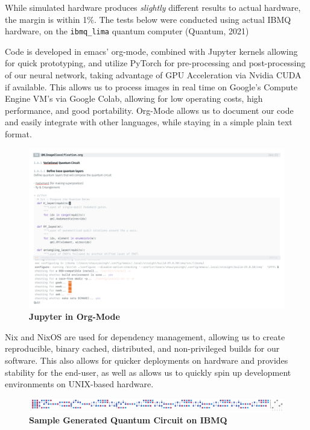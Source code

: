 \documentclass{scrartcl}
\makeatletter
\newcommand{\citeprocitem}[2]{\hyper@linkstart{cite}{citeproc_bib_item_#1}#2\hyper@linkend}
\makeatother
\begin{document}
While simulated hardware produces \emph{slightly} different results to actual hardware, the margin is within 1\%. The tests below were conducted using actual IBMQ hardware, on the \verb~ibmq_lima~ quantum computer (\citeprocitem{14}{Quantum, 2021})

Code is developed in emacs' org-mode, combined with Jupyter kernels allowing for quick prototyping, and utilize PyTorch for pre-processing and post-processing of our neural network, taking advantage of GPU Acceleration via Nvidia CUDA if available. This allows us to process images in real time on Google's Compute Engine VM's via Google Colab, allowing for low operating costs, high performance, and good portability. Org-Mode allows us to document our code and easily integrate with other languages, while staying in a simple plain text format.

\begin{figure}[htbp]
\centering
\includegraphics[width=.9\linewidth]{./assets/literatejupyter.png}
\caption{\textbf{Jupyter in Org-Mode}}
\end{figure}

Nix and NixOS are used for dependency management, allowing us to create reproducible, binary cached, distributed, and non-privileged builds for our software. This also allows for quicker deployments on hardware and provides stability for the end-user, as well as allows us to quickly spin up development environments on UNIX-based hardware.

\begin{figure}[htbp]
\centering
\includegraphics[width=.9\linewidth]{./assets/circuit.png}
\caption{\textbf{Sample Generated Quantum Circuit on IBMQ}}
\end{figure}
\end{document}
